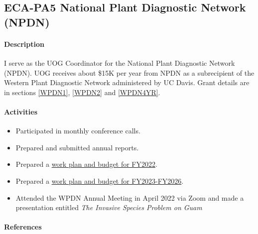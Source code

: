 \subsection{ECA-PA5 National Plant Diagnostic Network (NPDN)}
\begin{refsection}

\paragraph{Description}	

I serve as the UOG Coordinator for the National Plant Diagnostic Network (NPDN). UOG receives about \$15K per year from NPDN as a subrecipient of the Western Plant Diagnostic Network administered by UC Davis. Grant details are in  sections \ref{WPDN1}, \ref{WPDN2} and \ref{WPDN4YR}.

\paragraph{Activities}

\begin{itemize}
	\item Participated in monthly conference calls.
	\item Prepared and submitted annual reports.
	\item Prepared a \href{https://github.com/aubreymoore/WPDN/blob/main/WPDN\%202021-2022\%20workplan\%20and\%20budget.pdf}{work plan and budget for FY2022}.
	\item Prepared a \href{https://github.com/aubreymoore/WPDN/raw/main/4year/WPDN\%20FY23-FY26\%20workplan\%20and\%20budget\%20for\%20UOG.pdf}{work plan and budget for FY2023-FY2026}.
	\item Attended the WPDN Annual Meeting in April 2022 via Zoom and made a presentation entitled \textit{The Invasive Species Problem on Guam} \cite{moore_invasive_2022}
\end{itemize}
\begin{comment}
\paragraph{Plans for 15JAN2021-14JAN2022}

I will continue to act as UOG coordinator for WPDN.

\paragraph{Plans for 15JAN2022-14JAN2023}

I will continue to act as UOG coordinator for WPDN.
\end{comment}
\paragraph{References}
\printbibliography[heading=none]
\end{refsection}	

